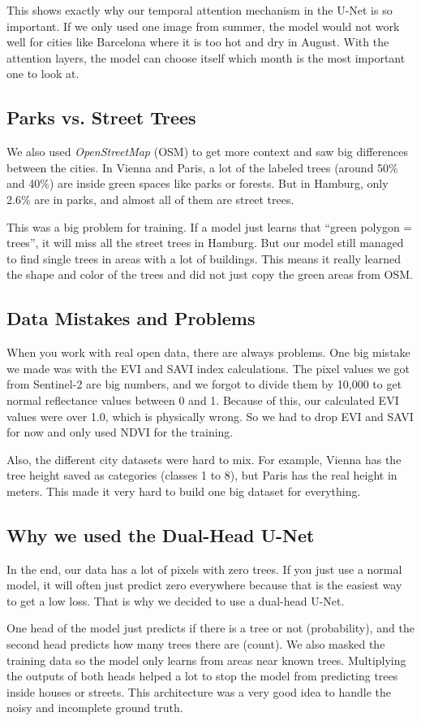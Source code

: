 This shows exactly why our temporal attention mechanism in the U-Net is so important. If we only used one image from summer, the model would not work well for cities like Barcelona where it is too hot and dry in August. With the attention layers, the model can choose itself which month is the most important one to look at.

\subsection{Parks vs. Street Trees}

We also used \textit{OpenStreetMap} (OSM) to get more context and saw big differences between the cities. In Vienna and Paris, a lot of the labeled trees (around 50\% and 40\%) are inside green spaces like parks or forests. But in Hamburg, only 2.6\% are in parks, and almost all of them are street trees. 

This was a big problem for training. If a model just learns that ``green polygon = trees'', it will miss all the street trees in Hamburg. But our model still managed to find single trees in areas with a lot of buildings. This means it really learned the shape and color of the trees and did not just copy the green areas from OSM.

\subsection{Data Mistakes and Problems}

When you work with real open data, there are always problems. One big mistake we made was with the EVI and SAVI index calculations. The pixel values we got from Sentinel-2 are big numbers, and we forgot to divide them by 10{,}000 to get normal reflectance values between 0 and 1. Because of this, our calculated EVI values were over 1.0, which is physically wrong. So we had to drop EVI and SAVI for now and only used NDVI for the training. 

Also, the different city datasets were hard to mix. For example, Vienna has the tree height saved as categories (classes 1 to 8), but Paris has the real height in meters. This made it very hard to build one big dataset for everything.

\subsection{Why we used the Dual-Head U-Net}

In the end, our data has a lot of pixels with zero trees. If you just use a normal model, it will often just predict zero everywhere because that is the easiest way to get a low loss. That is why we decided to use a dual-head U-Net. 

One head of the model just predicts if there is a tree or not (probability), and the second head predicts how many trees there are (count). We also masked the training data so the model only learns from areas near known trees. Multiplying the outputs of both heads helped a lot to stop the model from predicting trees inside houses or streets. This architecture was a very good idea to handle the noisy and incomplete ground truth.
